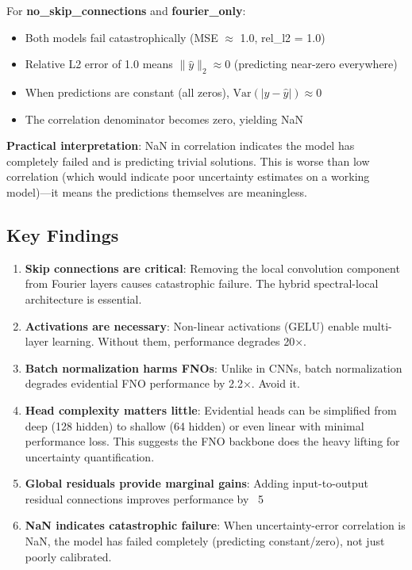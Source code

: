 For \textbf{no\_skip\_connections} and \textbf{fourier\_only}:
\begin{itemize}
\item Both models fail catastrophically (MSE $\approx$ 1.0, rel\_l2 = 1.0)
\item Relative L2 error of 1.0 means $\|\hat{y}\|_2 \approx 0$ (predicting near-zero everywhere)
\item When predictions are constant (all zeros), $\text{Var}(|y - \hat{y}|) \approx 0$
\item The correlation denominator becomes zero, yielding NaN
\end{itemize}

\textbf{Practical interpretation}: NaN in correlation indicates the model has completely failed and is predicting trivial solutions. This is worse than low correlation (which would indicate poor uncertainty estimates on a working model)—it means the predictions themselves are meaningless.

\subsection{Key Findings}

\begin{enumerate}
\item \textbf{Skip connections are critical}: Removing the local convolution component from Fourier layers causes catastrophic failure. The hybrid spectral-local architecture is essential.

\item \textbf{Activations are necessary}: Non-linear activations (GELU) enable multi-layer learning. Without them, performance degrades 20×.

\item \textbf{Batch normalization harms FNOs}: Unlike in CNNs, batch normalization degrades evidential FNO performance by 2.2×. Avoid it.

\item \textbf{Head complexity matters little}: Evidential heads can be simplified from deep (128 hidden) to shallow (64 hidden) or even linear with minimal performance loss. This suggests the FNO backbone does the heavy lifting for uncertainty quantification.

\item \textbf{Global residuals provide marginal gains}: Adding input-to-output residual connections improves performance by ~5%

\item \textbf{NaN indicates catastrophic failure}: When uncertainty-error correlation is NaN, the model has failed completely (predicting constant/zero), not just poorly calibrated.
\end{enumerate}

